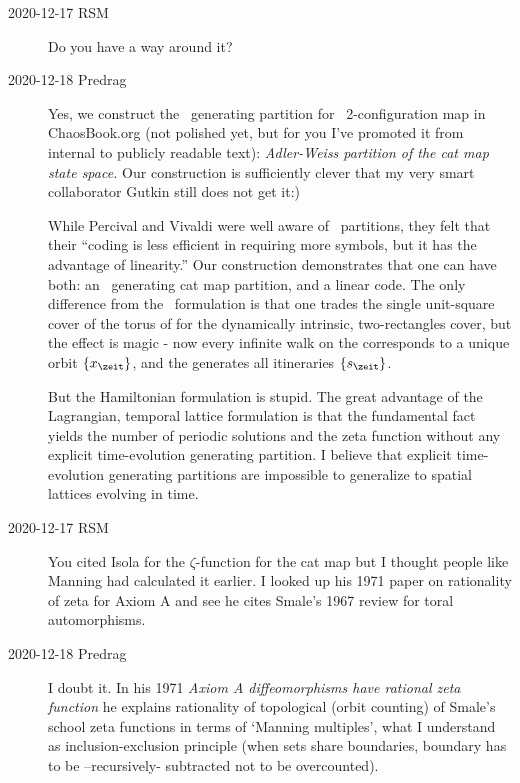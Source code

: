 \begin{description}
\item[2020-12-17 RSM]
Do you have a way around it?

\item[2020-12-18 Predrag]
Yes, we construct the \AW\ generating partition for \PV\ 2-configuration
map in ChaosBook.org (not polished yet, but for you I've promoted it from
internal to publicly readable text):
 {\em Adler-Weiss partition of
the cat map state space.} Our construction is sufficiently clever that my
very smart collaborator Gutkin still does not get it:)

While Percival and Vivaldi were well aware of \AW\ partitions, they felt
that their ``coding is less efficient in requiring more symbols, but it
has the advantage of linearity.'' Our construction demonstrates that one
can have both:  an \AW\ generating cat map partition, and a linear code.
The only difference from the \PV\ formulation is that one
trades the single unit-square cover of the torus of
 for the dynamically intrinsic, two-rectangles
cover, but the effect is magic - now every
infinite walk on the {\markGraph}
corresponds to a unique {\admissible} orbit $\{\ssp_{\zeit}\}$, and the
{\markGraph} generates all {\admissible} itineraries $\{\Ssym{\zeit}\}$.

But the Hamiltonian formulation is stupid. The great advantage of the
Lagrangian, temporal lattice formulation is that the fundamental fact
yields the number of periodic solutions and the zeta function without any
explicit time-evolution generating partition. I believe that explicit
time-evolution generating partitions are impossible to generalize to
spatial lattices evolving in time.

\item[2020-12-17 RSM]
You cited Isola for the {$\zeta$}-function  for the cat map
but I thought people like Manning had calculated it earlier.  I looked up
his 1971 paper on rationality of zeta for Axiom A and see he cites
Smale's 1967 review for toral automorphisms.

\item[2020-12-18 Predrag]
I doubt it. In his 1971
{\em {Axiom A} diffeomorphisms have rational zeta function}
he explains rationality of topological (orbit counting)
of Smale's school zeta functions in terms of `Manning multiples',
what I understand as
inclusion-exclusion principle (when sets share boundaries, boundary has
to be –recursively- subtracted not to be overcounted).


\end{description}
